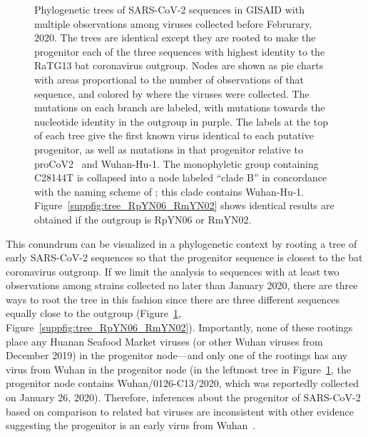 \documentclass[9pt,twocolumn,twoside]{gsajnl_modified}
\begin{document}
\begin{figure}
{ }
 \caption{
 Phylogenetic trees of SARS-CoV-2 sequences in GISAID with multiple observations among viruses collected before Februrary, 2020.
 The trees are identical except they are rooted to make the progenitor each of the three sequences with highest identity to the RaTG13 bat coronavirus outgroup.
Nodes are shown as pie charts with areas proportional to the number of observations of that sequence, and colored by where the viruses were collected.
The mutations on each branch are labeled, with mutations towards the nucleotide identity in the outgroup in purple.
The labels at the top of each tree give the first known virus identical to each putative progenitor, as well as mutations in that progenitor relative to proCoV2~\citep{kumar2021evolutionary} and Wuhan-Hu-1.
The monophyletic group containing C28144T is collapsed into a node labeled ``clade B'' in concordance with the naming scheme of \citet{rambaut2020dynamic}; this clade contains Wuhan-Hu-1.
 Figure~\ref{suppfig:tree_RpYN06_RmYN02} shows identical results are obtained if the outgroup is RpYN06 or RmYN02.
\label{fig:tree_RaTG13}
 }
 \end{figure}

This conundrum can be visualized in a phylogenetic context by rooting a tree of early SARS-CoV-2 sequences so that the progenitor sequence is closest to the bat coronavirus outgroup.
If we limit the analysis to sequences with at least two observations among strains collected no later than January 2020, there are three ways to root the tree in this fashion since there are three different sequences equally close to the outgroup (Figure~\ref{fig:tree_RaTG13}, Figure~\ref{suppfig:tree_RpYN06_RmYN02}).
Importantly, none of these rootings place any Huanan Seafood Market viruses (or other Wuhan viruses from December 2019) in the progenitor node---and only one of the rootings has any virus from Wuhan in the progenitor node (in the leftmost tree in Figure~\ref{fig:tree_RaTG13}, the progenitor node contains Wuhan/0126-C13/2020, which was reportedly collected on January 26, 2020).
Therefore, inferences about the progenitor of SARS-CoV-2 based on comparison to related bat viruses are inconsistent with other evidence suggesting the progenitor is an early virus from Wuhan~\citep{pipes2021assessing}.
\end{document}
